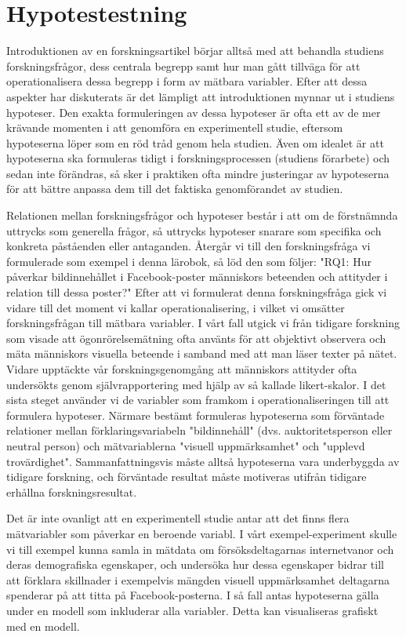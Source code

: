 \documentclass[
]{book}
\begin{document}
\hypertarget{sec06.3}{%
\section{Hypotestestning}\label{sec06.3}}

Introduktionen av en forskningsartikel börjar alltså med att behandla studiens forskningsfrågor, dess centrala begrepp samt hur man gått tillväga för att operationalisera dessa begrepp i form av mätbara variabler. Efter att dessa aspekter har diskuterats är det lämpligt att introduktionen mynnar ut i studiens hypoteser. Den exakta formuleringen av dessa hypoteser är ofta ett av de mer krävande momenten i att genomföra en experimentell studie, eftersom hypoteserna löper som en röd tråd genom hela studien. Även om idealet är att hypoteserna ska formuleras tidigt i forskningsprocessen (studiens förarbete) och sedan inte förändras, så sker i praktiken ofta mindre justeringar av hypoteserna för att bättre anpassa dem till det faktiska genomförandet av studien.

Relationen mellan forskningsfrågor och hypoteser består i att om de förstnämnda uttrycks som generella frågor, så uttrycks hypoteser snarare som specifika och konkreta påståenden eller antaganden. Återgår vi till den forskningsfråga vi formulerade som exempel i denna lärobok, så löd den som följer: "RQ1: Hur påverkar bildinnehållet i Facebook-poster människors beteenden och attityder i relation till dessa poster?" Efter att vi formulerat denna forskningsfråga gick vi vidare till det moment vi kallar operationalisering, i vilket vi omsätter forskningsfrågan till mätbara variabler. I vårt fall utgick vi från tidigare forskning som visade att ögonrörelsemätning ofta använts för att objektivt observera och mäta människors visuella beteende i samband med att man läser texter på nätet. Vidare upptäckte vår forskningsgenomgång att människors attityder ofta undersökts genom självrapportering med hjälp av så kallade likert-skalor. I det sista steget använder vi de variabler som framkom i operationaliseringen till att formulera hypoteser. Närmare bestämt formuleras hypoteserna som förväntade relationer mellan förklaringsvariabeln "bildinnehåll" (dvs. auktoritetsperson eller neutral person) och mätvariablerna "visuell uppmärksamhet" och "upplevd trovärdighet". Sammanfattningsvis måste alltså hypoteserna vara underbyggda av tidigare forskning, och förväntade resultat måste motiveras utifrån tidigare erhållna forskningsresultat.

Det är inte ovanligt att en experimentell studie antar att det finns flera mätvariabler som påverkar en beroende variabl. I vårt exempel-experiment skulle vi till exempel kunna samla in mätdata om försöksdeltagarnas internetvanor och deras demografiska egenskaper, och undersöka hur dessa egenskaper bidrar till att förklara skillnader i exempelvis mängden visuell uppmärksamhet deltagarna spenderar på att titta på Facebook-posterna. I så fall antas hypoteserna gälla under en modell som inkluderar alla variabler. Detta kan visualiseras grafiskt med en modell.
\end{document}
